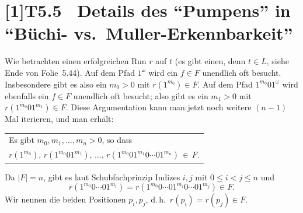 \documentclass[fontsize=11pt, twoside=false, numbers=autoenddot]{scrbook}
\begin{document}
\section*{\scalebox{.96}[1]{T5.5~ Details des "`Pumpens"' in "`Büchi- vs.\ Muller-Erkennbarkeit"'}}

Wie betrachten einen erfolgreichen Run $r$ auf $t$ (es gibt einen, denn $t \in L$, siehe Ende von Folie~5.44).
Auf dem Pfad $1^\omega$ wird ein $f \in F$ unendlich oft besucht.
Insbesondere gibt es also ein $m_0 > 0$ mit $r(1^{m_0}) \in F$.
Auf dem Pfad $1^{m_0}01^\omega$ wird ebenfalls ein $f \in F$ unendlich oft besucht;
also gibt es ein $m_1 > 0$ mit $r(1^{m_0}01^{m_1}) \in F$.
Diese Argumentation kann man jetzt noch weitere $(n-1)$ Mal iterieren,
und man erhält:
%
\begin{center}
  \begin{tabular}{@{}l@{}}
    Es gibt $m_0,m_1,\dots,m_n > 0$, so dass\\[2pt]
    $r(1^{m_0}),\, r(1^{m_0}01^{m_1}),\, \dots,\, r(1^{m_0}01^{m_1}0\cdots01^{m_n}) \,\in\, F$.
  \end{tabular}
\end{center}
%
Da $|F|=n$, gibt es laut Schubfachprinzip Indizes $i,j$ mit $0 \leq i < j \leq n$
und
\[
  r(1^{m_0}0\cdots01^{m_i}) = r(1^{m_0}0\cdots01^{m_i}0\cdots01^{m_j}) \in F.
\]
Wir nennen die beiden Positionen $p_i,p_j$, d.\,h.\ $r(p_i) = r(p_j) \in F$.
\end{document}
